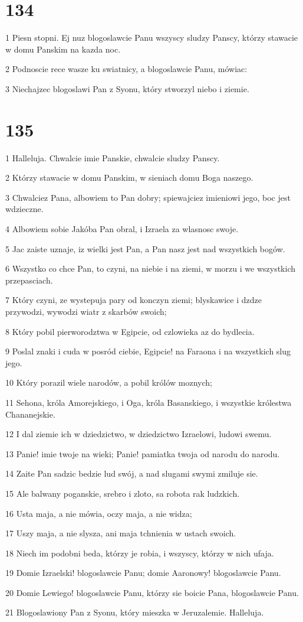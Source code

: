 \chapter{134}

\par 1 Piesn stopni. Ej nuz blogoslawcie Panu wszyscy sludzy Panscy, którzy stawacie w domu Panskim na kazda noc.
\par 2 Podnoscie rece wasze ku swiatnicy, a blogoslawcie Panu, mówiac:
\par 3 Niechajzec blogoslawi Pan z Syonu, który stworzyl niebo i ziemie.

\chapter{135}

\par 1 Halleluja. Chwalcie imie Panskie, chwalcie sludzy Panscy.
\par 2 Którzy stawacie w domu Panskim, w sieniach domu Boga naszego.
\par 3 Chwalciez Pana, albowiem to Pan dobry; spiewajciez imieniowi jego, boc jest wdzieczne.
\par 4 Albowiem sobie Jakóba Pan obral, i Izraela za wlasnosc swoje.
\par 5 Jac zaiste uznaje, iz wielki jest Pan, a Pan nasz jest nad wszystkich bogów.
\par 6 Wszystko co chce Pan, to czyni, na niebie i na ziemi, w morzu i we wszystkich przepasciach.
\par 7 Który czyni, ze wystepuja pary od konczyn ziemi; blyskawice i dzdze przywodzi, wywodzi wiatr z skarbów swoich;
\par 8 Który pobil pierworodztwa w Egipcie, od czlowieka az do bydlecia.
\par 9 Poslal znaki i cuda w posród ciebie, Egipcie! na Faraona i na wszystkich slug jego.
\par 10 Który porazil wiele narodów, a pobil królów moznych;
\par 11 Sehona, króla Amorejskiego, i Oga, króla Basanskiego, i wszystkie królestwa Chananejskie.
\par 12 I dal ziemie ich w dziedzictwo, w dziedzictwo Izraelowi, ludowi swemu.
\par 13 Panie! imie twoje na wieki; Panie! pamiatka twoja od narodu do narodu.
\par 14 Zaite Pan sadzic bedzie lud swój, a nad slugami swymi zmiluje sie.
\par 15 Ale balwany poganskie, srebro i zloto, sa robota rak ludzkich.
\par 16 Usta maja, a nie mówia, oczy maja, a nie widza;
\par 17 Uszy maja, a nie slysza, ani maja tchnienia w ustach swoich.
\par 18 Niech im podobni beda, którzy je robia, i wszyscy, którzy w nich ufaja.
\par 19 Domie Izraelski! blogoslawcie Panu; domie Aaronowy! blogoslawcie Panu.
\par 20 Domie Lewiego! blogoslawcie Panu, którzy sie boicie Pana, blogoslawcie Panu.
\par 21 Blogoslawiony Pan z Syonu, który mieszka w Jeruzalemie. Halleluja.

